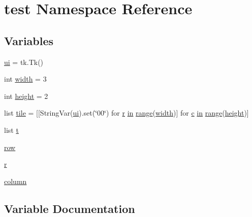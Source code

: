 \hypertarget{namespacetest}{}\section{test Namespace Reference}
\label{namespacetest}
\subsection*{Variables}
\begin{DoxyCompactItemize}
\item 
\mbox{\hyperlink{namespacetest_a2e4e93323d5077e198ecdc67c609e488}{ui}} = tk.\+Tk()
\item 
int \mbox{\hyperlink{namespacetest_a064937db856e36c5389241650eb91307}{width}} = 3
\item 
int \mbox{\hyperlink{namespacetest_a0981d504d028598d82644c006c420453}{height}} = 2
\item 
list \mbox{\hyperlink{namespacetest_a07a6334fbd8825c05776b33e39049434}{tile}} = \mbox{[}\mbox{[}String\+Var(\mbox{\hyperlink{namespacetest_a2e4e93323d5077e198ecdc67c609e488}{ui}}).set(\char`\"{}00\char`\"{}) for \mbox{\hyperlink{_s_d_l__opengl_8h_a42ce7cdc612e53abee15043f80220d97}{r}} \mbox{\hyperlink{_s_d_l__opengl__glext_8h_a83ad0ee7f1e06b59c90271716e689080}{in}} \mbox{\hyperlink{_s_d_l__opengl__glext_8h_a73b00379db2c7ac5e30a3aa2954a50ee}{range}}(\mbox{\hyperlink{_s_d_l__opengl_8h_a9a82cf3caff84cabc4598e2619faac17}{width}})\mbox{]} for \mbox{\hyperlink{_s_d_l__opengl__glext_8h_a1f2d7f8147412c43ba2303a56f97ee73}{c}} \mbox{\hyperlink{_s_d_l__opengl__glext_8h_a83ad0ee7f1e06b59c90271716e689080}{in}} \mbox{\hyperlink{_s_d_l__opengl__glext_8h_a73b00379db2c7ac5e30a3aa2954a50ee}{range}}(\mbox{\hyperlink{_s_d_l__opengl_8h_aa352f2804b9902ac30769c00dde75d5f}{height}})\mbox{]}
\item 
list \mbox{\hyperlink{namespacetest_a2c4aff22c8d480238b3dfd81a25b9b70}{t}}
\item 
\mbox{\hyperlink{namespacetest_acd02555154e98da6e1aef05f9f04eeff}{row}}
\item 
\mbox{\hyperlink{namespacetest_ac1f92ca15306aee561188e0f37aabc66}{r}}
\item 
\mbox{\hyperlink{namespacetest_ad1b3078938fb6b942af61a58223152f4}{column}}
\end{DoxyCompactItemize}


\subsection{Variable Documentation}
\mbox{\label{namespacetest_ad1b3078938fb6b942af61a58223152f4}} 
